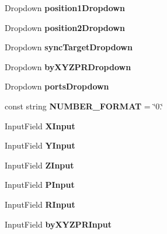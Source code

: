 \begin{DoxyCompactItemize}
Dropdown {\bfseries position1\+Dropdown}
\item 
\mbox{\label{class_game_controller_a24f08008c3b69c0080db2552814f3fd7}} 
Dropdown {\bfseries position2\+Dropdown}
\item 
\mbox{\label{class_game_controller_a86151fd816f256a8ace360b1f23de787}} 
Dropdown {\bfseries sync\+Target\+Dropdown}
\item 
\mbox{\label{class_game_controller_a6222d16bb3172fdacdf5b5cc363149ff}} 
Dropdown {\bfseries by\+X\+Y\+Z\+P\+R\+Dropdown}
\item 
\mbox{\label{class_game_controller_a6a8c35edbf074628654ce3ac17073469}} 
Dropdown {\bfseries ports\+Dropdown}
\item 
\mbox{\label{class_game_controller_a42c3a41c40593254c896723f9dd27cb4}} 
const string {\bfseries N\+U\+M\+B\+E\+R\+\_\+\+F\+O\+R\+M\+AT} = \char`\"{}0.\char`\"{}
\item 
\mbox{\label{class_game_controller_a1504267c57340df37ec5de3372e15b3b}} 
Input\+Field {\bfseries X\+Input}
\item 
\mbox{\label{class_game_controller_a6efb47b46d86c8b51787cacd7c8f5bc8}} 
Input\+Field {\bfseries Y\+Input}
\item 
\mbox{\label{class_game_controller_a0f59c47b2c7ac668152041e05f86458f}} 
Input\+Field {\bfseries Z\+Input}
\item 
\mbox{\label{class_game_controller_a5ae20c66fd6de352ab0f4e181027a61f}} 
Input\+Field {\bfseries P\+Input}
\item 
\mbox{\label{class_game_controller_a909684cd4f88d27998aab5517d01fb41}} 
Input\+Field {\bfseries R\+Input}
\item 
\mbox{\label{class_game_controller_a0e29079c699df359be73fc23f7c1dbc6}} 
Input\+Field {\bfseries by\+X\+Y\+Z\+P\+R\+Input}
\item 

\end{DoxyCompactItemize}
